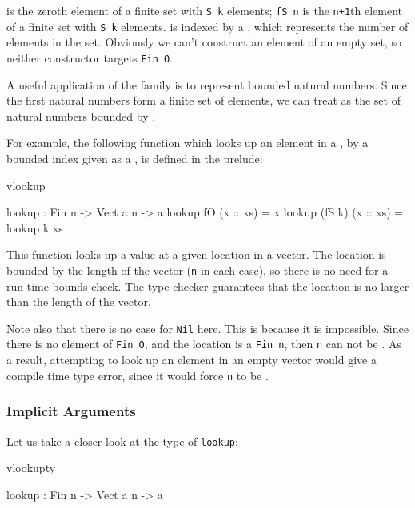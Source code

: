 \noindent
{} is the zeroth element of a finite set with \texttt{S k} elements; 
\texttt{fS n} is the
\texttt{n+1}th element of a finite set with \texttt{S k} elements. 
 is indexed by a , which
represents the number of elements in the set. Obviously we can't construct an
element of an empty set, so neither constructor targets \texttt{Fin O}.

A useful application of the  family is to represent bounded
natural numbers. Since the first  natural numbers form a finite
set of  elements, we can treat  as the set of natural
numbers bounded by . 

For example, the following function which looks up an element in a ,
by a bounded index given as a , is defined in the prelude:

\begin{SaveVerbatim}{vlookup}

lookup : Fin n -> Vect a n -> a
lookup fO     (x :: xs) = x
lookup (fS k) (x :: xs) = lookup k xs

\end{SaveVerbatim}

\noindent
This function looks up a value at a given location in a vector. The location is
bounded by the length of the vector (\texttt{n} in each case), so there is no
need for a run-time bounds check. The type checker guarantees that the location
is no larger than the length of the vector.

Note also that there is no case for \texttt{Nil} here. This is because it is
impossible. Since there is no element of \texttt{Fin O}, and the location is a
\texttt{Fin n}, then \texttt{n} can not be .  As a result, attempting to
look up an element in an empty vector would give a compile time type error,
since it would force \texttt{n} to be .

\subsubsection{Implicit Arguments}

Let us take a closer look at the type of \texttt{lookup}:

\begin{SaveVerbatim}{vlookupty}

lookup : Fin n -> Vect a n -> a

\end{SaveVerbatim}

